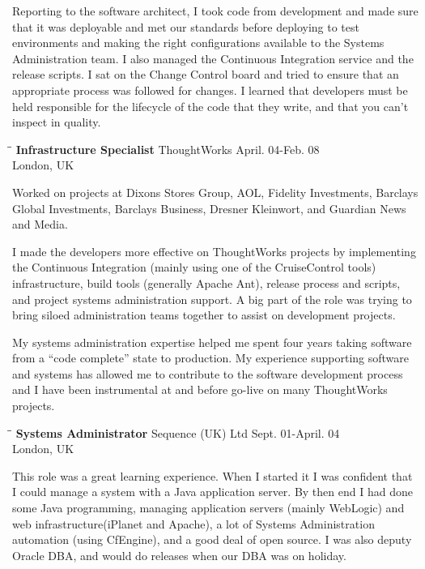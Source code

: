 \documentclass{res}
\begin{document}
\begin{resume}
Reporting to the software architect, I took code from development and made sure that it was deployable and met our standards before deploying to test environments and making the right configurations available to the Systems Administration team.  I also managed the Continuous Integration service and the release scripts.  I sat on the Change Control board and tried to ensure that an appropriate process was followed for changes.  I learned that developers must be held responsible for the lifecycle of the code that they write, and that you can't inspect in quality.

   \begin{tabbing}
   \hspace{2.3in}\= \hspace{2.6in}\= \kill %
    {\bf Infrastructure Specialist} \>ThoughtWorks \> April. 04-Feb. 08\\
                          \>London, UK
   \end{tabbing}\vspace{-20pt}
	Worked on projects at Dixons Stores Group, AOL, Fidelity Investments,  Barclays Global Investments, Barclays Business, Dresner Kleinwort, and Guardian News and Media.
	
     I made the developers more effective on ThoughtWorks projects by implementing the Continuous Integration (mainly using one of the CruiseControl tools) infrastructure, build tools (generally Apache Ant), release process and scripts, and project systems administration support.  A big part of the role was trying to bring siloed administration teams together to assist on development projects.

	My systems administration expertise helped me spent four years taking software from a ``code complete'' state to production.  My experience supporting software and systems has allowed me to contribute to the software development process and I have been instrumental at and before go-live on many ThoughtWorks projects.

	\begin{tabbing}
	   \hspace{2.3in}\= \hspace{2.6in}\= \kill %
	    {\bf Systems Administrator} \>Sequence (UK) Ltd \> Sept. 01-April. 04\\
	                          \>London, UK
	   \end{tabbing}\vspace{-20pt}
	This role was a great learning experience.  When I started it I was confident that I could manage a system with a Java application server.  By then end I had done some Java programming, managing application servers (mainly WebLogic) and web infrastructure(iPlanet and Apache), a lot of Systems Administration automation (using CfEngine), and a good deal of open source.  I was also deputy Oracle DBA, and would do releases when our DBA was on holiday.


\end{resume}
\end{document}
